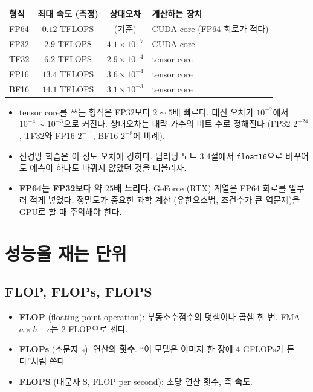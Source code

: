 \documentclass[11pt,a4paper]{article}
\begin{document}
\begin{center}
{\small
\begin{tabular}{@{}lccl@{}}
\toprule
형식 & 최대 속도 (측정) & 상대오차 & 계산하는 장치 \\
\midrule
FP64 & $0.12$ TFLOPS & (기준) & CUDA core (FP64 회로가 적다) \\
FP32 & $2.9$ TFLOPS & $4.1\times10^{-7}$ & CUDA core \\
TF32 & $6.2$ TFLOPS & $2.9\times10^{-4}$ & tensor core \\
FP16 & $13.4$ TFLOPS & $3.6\times10^{-4}$ & tensor core \\
BF16 & $14.1$ TFLOPS & $3.1\times10^{-3}$ & tensor core \\
\bottomrule
\end{tabular}}
\end{center}

\begin{itemize}[leftmargin=1.5em]
\item tensor core를 쓰는 형식은 FP32보다 $2\sim5$배 빠르다. 대신 오차가 $10^{-7}$에서 $10^{-4}\sim10^{-3}$으로 커진다.
상대오차는 대략 가수의 비트 수로 정해진다 (FP32 $2^{-24}$, TF32와 FP16 $2^{-11}$, BF16 $2^{-8}$에 비례).
\item 신경망 학습은 이 정도 오차에 강하다. 딥러닝 노트 3.4절에서 \texttt{float16}으로 바꾸어도 예측이 하나도 바뀌지 않았던 것을 떠올리자.
\item \textbf{FP64는 FP32보다 약 $25$배 느리다.} GeForce (RTX) 계열은 FP64 회로를 일부러 적게 넣었다. 정밀도가 중요한 과학 계산 (유한요소법, 조건수가 큰 역문제)을 GPU로 할 때 주의해야 한다.
\end{itemize}

\section{성능을 재는 단위}\label{sec:metrics}

\subsection{FLOP, FLOPs, FLOPS}\label{sec:flops}

\begin{itemize}[leftmargin=1.5em]
\item \textbf{FLOP} (floating-point operation): 부동소수점수의 덧셈이나 곱셈 한 번. FMA $a\times b+c$는 $2$ FLOP으로 센다.
\item \textbf{FLOPs} (소문자 s): 연산의 \textbf{횟수}. ``이 모델은 이미지 한 장에 $4$ GFLOPs가 든다''처럼 쓴다.
\item \textbf{FLOPS} (대문자 S, FLOP per second): 초당 연산 횟수, 즉 \textbf{속도}.
\end{itemize}
\end{document}
